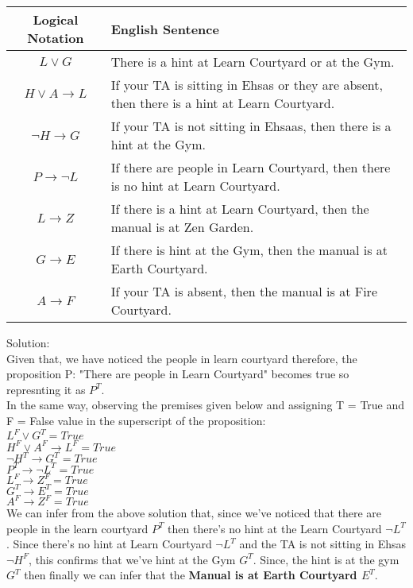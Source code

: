 \documentclass[addpoints]{exam}
\begin{document}
\begin{questions}
\begin{solution}
    \begin{tabularx}{\textwidth}{c|X}
      Logical Notation          & English Sentence                                                                            \\\hline\hline
      $ L \vee G $              & There is a hint at Learn Courtyard or at the Gym.                                           \\\hline
      $ H \vee A \rightarrow L$ & If your TA is sitting in Ehsas or they are absent, then there is a hint at Learn Courtyard. \\\hline
      $ \neg H \rightarrow G $  & If your TA is not sitting in Ehsaas, then there is a hint at the Gym.                       \\\hline
      $ P \rightarrow \neg L $  & If there are people in Learn Courtyard, then there is no hint at Learn Courtyard.           \\\hline
      $ L \rightarrow Z $       & If there is a hint at Learn Courtyard, then the manual is at Zen Garden.                    \\\hline
      $ G \rightarrow E $       & If there is hint at the Gym, then the manual is at Earth Courtyard.                         \\\hline
      $ A \rightarrow F $       & If your TA is absent, then the manual is at Fire Courtyard.                                 \\\hline
    \end{tabularx}

    Solution:\\
    Given that, we have noticed the people in learn courtyard therefore, the proposition P: "There are people in Learn Courtyard" becomes true so represnting it as $P^{T}.$\\
    In the same way, observing the premises given below and assigning T = True and F = False value in the superscript of the proposition:\\
    $ L^{F} \vee G^{T} = True $\\
    $ H^{F} \vee A^{F} \rightarrow L^{F} = True $\\
    $ \neg H^{T} \rightarrow G^{T} = True $\\
    $ P^{T} \rightarrow \neg L^{T} = True $\\
    $ L^{F} \rightarrow Z^{F} = True $\\
    $ G^{T} \rightarrow E^{T} = True $\\
    $ A^{F} \rightarrow Z^{F} = True $\\
    We can infer from the above solution that, since we've noticed that there are people in the learn courtyard $P^{T}$ then there's no hint at the Learn Courtyard $\neg L^{T}$ . Since there's no hint at Learn Courtyard $\neg L^{T}$ and the TA is not sitting in Ehsas $\neg H^{F}$, this confirms that we've hint at the Gym $ G^{T} $. Since, the hint is at the gym $ G^{T} $ then finally we can infer that the \textbf{Manual is at Earth Courtyard $E^{T}.$}\\
  \end{solution}


\end{questions}
\end{document}
